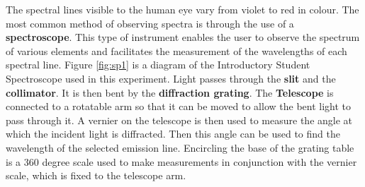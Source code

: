 The spectral lines visible to the human eye vary from violet to red in colour. The most common method of observing spectra is through the use of a {\bf spectroscope}. This type of instrument enables the user to observe the spectrum of various elements and facilitates the measurement of the wavelengths of each spectral line. Figure \ref{fig:sp1} is a diagram of the Introductory Student Spectroscope used in this experiment. Light passes through the {\bf slit} and the {\bf collimator}. It is then bent by the {\bf diffraction grating}. The {\bf Telescope} is connected to a rotatable arm so that it can be moved to allow the bent light to pass through it. A vernier on the telescope is then used to measure the angle at which the incident light is diffracted. Then this angle can be used to find the wavelength of the selected emission line. Encircling the base of the grating table is a 360 degree scale used to make measurements in conjunction with the vernier scale, which is fixed to the telescope arm.

